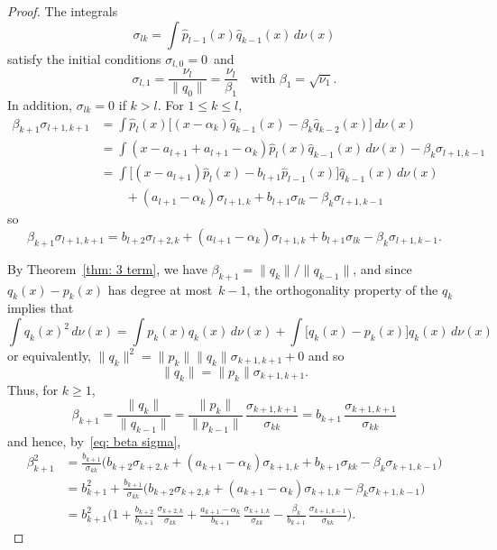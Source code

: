 \documentclass[12pt,a4paper]{article}
\begin{document}
\begin{proof}
The integrals
\[
\sigma_{lk}=\int\hat p_{l-1}(x)\hat q_{k-1}(x)\,d\nu(x)
\]
satisfy the initial conditions $\sigma_{l,0}=0$~and 
\[
\sigma_{l,1}=\frac{\nu_l}{\|q_0\|}
	=\frac{\nu_l}{\beta_1}  
\quad\text{with $\beta_1=\sqrt{\nu_1}$.}
\]
In addition, $\sigma_{lk}=0$ if $k>l$. 
For $1\le k\le l$,
\begin{align*}
\beta_{k+1}\sigma_{l+1,k+1}&=\int\hat p_l(x)\bigl[
(x-\alpha_k)\hat q_{k-1}(x)-\beta_k\hat q_{k-2}(x)\bigr]\,d\nu(x)\\
	&=\int(x-a_{l+1}+a_{l+1}-\alpha_k)
		\hat p_l(x)\hat q_{k-1}(x)\,d\nu(x)
		-\beta_k\sigma_{l+1,k-1}\\
	&=\int\bigl[(x-a_{l+1})\hat p_l(x)-b_{l+1}\hat p_{l-1}(x)\bigr]
		\hat q_{k-1}(x)\,d\nu(x)\\
	&\qquad{}+(a_{l+1}-\alpha_k)\sigma_{l+1,k}
		+b_{l+1}\sigma_{lk}-\beta_k\sigma_{l+1,k-1}
\end{align*}
so
\begin{equation}\label{eq: beta sigma}
\beta_{k+1}\sigma_{l+1,k+1}=b_{l+2}\sigma_{l+2,k}
	+(a_{l+1}-\alpha_k)\sigma_ { l+1 , k }
		+b_{l+1}\sigma_{lk}-\beta_k\sigma_{l+1,k-1}.
\end{equation}

By Theorem~\ref{thm: 3 term}, we have 
$\beta_{k+1}=\|q_k\|/\|q_{k-1}\|$,
and since $q_k(x)-p_k(x)$ has degree at most~$k-1$, the orthogonality 
property of the $q_k$ implies that
\[
\int q_k(x)^2\,d\nu(x)=\int p_k(x)q_k(x)\,d\nu(x)
	+\int\bigl[q_k(x)-p_k(x)\bigr]q_k(x)\,d\nu(x)
\]
or equivalently, $\|q_k\|^2=\|p_k\|\|q_k\|\sigma_{k+1,k+1}+0$ and so
\begin{equation}\label{eq: norm pk qk}
\|q_k\|=\|p_k\|\sigma_{k+1,k+1}.
\end{equation}
Thus, for $k\ge1$,
\[
\beta_{k+1}=\frac{\|q_k\|}{\|q_{k-1}\|}
	=\frac{\|p_k\|}{\|p_{k-1}\|}\, 
		\frac{\sigma_{k+1,k+1}}{\sigma_{kk}}
	=b_{k+1}\,\frac{\sigma_{k+1,k+1}}{\sigma_{kk}}
\]
and hence, by~\eqref{eq: beta sigma},
\begin{align*}
\beta_{k+1}^2&=\frac{b_{k+1}}{\sigma_{kk}}\biggl(
	b_{k+2}\sigma_{k+2,k}+(a_{k+1}-\alpha_k)\sigma_{k+1,k}
	+b_{k+1}\sigma_{kk}-\beta_k\sigma_{k+1,k-1}\biggr)\\
	&=b_{k+1}^2+\frac{b_{k+1}}{\sigma_{kk}}\biggl(
	b_{k+2}\sigma_{k+2,k}+(a_{k+1}-\alpha_k)\sigma_{k+1,k}
	-\beta_k\sigma_{k+1,k-1}\biggr)\\
	&=b_{k+1}^2\biggl(1
		+\frac{b_{k+2}}{b_{k+1}}\,\frac{\sigma_{k+2,k}}{\sigma_{kk}}
		+\frac{a_{k+1}-\alpha_k}{b_{k+1}}\,
			\frac{\sigma_{k+1,k}}{\sigma_{kk}}
		-\frac{\beta_k}{b_{k+1}}\,
			\frac{\sigma_{k+1,k-1}}{\sigma_{kk}}\biggr).
\end{align*}


\end{proof}
\end{document}
